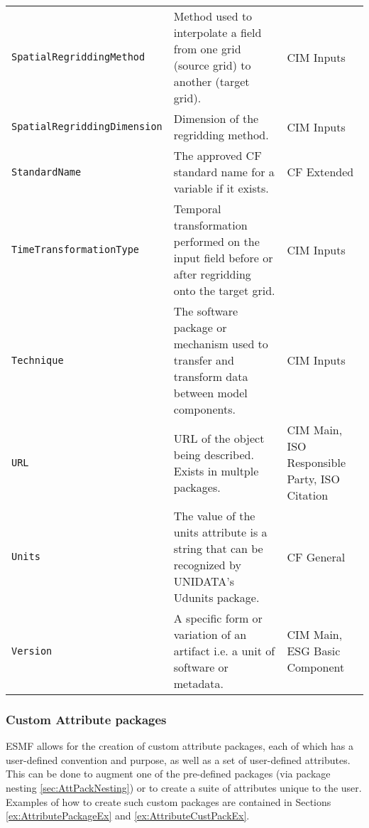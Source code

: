 \begin{longtable}{|p{7cm}|p{5cm}|p{2cm}}
     {\tt SpatialRegriddingMethod} & Method used to interpolate a field from one grid (source grid) to another (target grid). & CIM Inputs\\ 
     {\tt SpatialRegriddingDimension} & Dimension of the regridding method. & CIM Inputs\\
     {\tt StandardName} & The approved CF standard name for a variable if it exists. &  CF Extended\\
     {\tt TimeTransformationType} & Temporal transformation performed on the input field before or after regridding onto the target grid.& CIM Inputs\\ 
     {\tt Technique} & The software package or mechanism used to transfer and transform data between model components. & CIM Inputs\\ 
     {\tt URL} & URL of the object being described. Exists in multple packages. & CIM Main, ISO Responsible Party, ISO Citation\\
     {\tt Units}  & The value of the units attribute is a string that can be recognized by UNIDATA's Udunits package. & CF General\\
     {\tt Version} & A specific form or variation of an artifact i.e. a unit of software or metadata. & CIM Main, ESG Basic Component\\ 
\hline\hline
\end{longtable}

\vspace{.20in}

\subsubsection{Custom Attribute packages}
\label{sec:CustomAttPacks}

ESMF allows for the creation of custom attribute packages, each of which has a user-defined convention and purpose, as well as a set of user-defined attributes. This can be done to augment one of the pre-defined packages (via package nesting \ref{sec:AttPackNesting}) or to create a suite of attributes unique to the user. Examples of how to create such custom packages are contained in Sections \ref{ex:AttributePackageEx} and \ref{ex:AttributeCustPackEx}.
